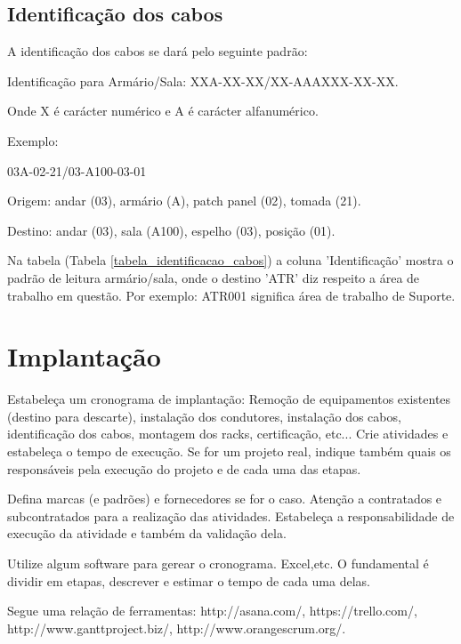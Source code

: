 \documentclass[	DIV=calc,%
							paper=a4,%
							fontsize=12pt,%
							onecolumn]{scrartcl}	 					%
\begin{document}
\subsection{Identificação dos cabos}

A identificação dos cabos se dará pelo seguinte padrão: \newline

Identificação para Armário/Sala: \newline
 XXA-XX-XX/XX-AAAXXX-XX-XX.\newline

Onde X é carácter numérico e A é carácter alfanumérico.\newline

Exemplo: 

03A-02-21/03-A100-03-01\newline

Origem: andar (03), armário (A), patch panel (02), tomada (21).

Destino: andar (03), sala (A100), espelho (03), posição (01).\newline

Na tabela (Tabela \ref{tabela_identificacao_cabos}) a coluna 'Identificação' mostra o padrão de leitura armário/sala, onde o destino 'ATR' diz respeito a área de trabalho em questão. Por exemplo: ATR001 significa área de trabalho de Suporte.

\newpage


\section{Implantação}
Estabeleça um cronograma de implantação:
Remoção de equipamentos existentes (destino para descarte), instalação dos condutores, instalação dos cabos, 
identificação dos cabos, montagem dos racks, certificação, etc... Crie atividades e estabeleça o tempo de execução. Se for um projeto real, indique também quais os responsáveis pela execução do projeto e de cada uma das etapas.

Defina marcas (e padrões) e fornecedores se for o caso. Atenção a contratados e subcontratados para a realização das atividades. Estabeleça a responsabilidade de execução da atividade e também da validação dela.

Utilize algum software para gerear o cronograma. Excel,etc. O fundamental é dividir em etapas, descrever e estimar o tempo de cada uma delas.

Segue uma relação de ferramentas:
http://asana.com/, 
https://trello.com/, 
http://www.ganttproject.biz/, 
http://www.orangescrum.org/. 
\end{document}
